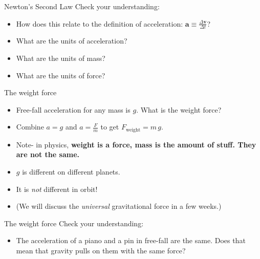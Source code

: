 \documentclass[english]{beamer}
\begin{document}
\begin{frame}{Newton's Second Law}
  Check your understanding: 
  \begin{itemize}
    \item How does this relate to the definition of acceleration: $\mathbf{a} \equiv \frac{\Delta \mathbf{v}}{\Delta t}$?
    \item What are the units of acceleration?
    \item What are the units of mass? 
    \item What are the units of force?
  \end{itemize}
\end{frame}

\begin{frame}{The weight force}
  \begin{itemize}
    \item Free-fall acceleration for any mass is $g$. What is the weight force?
    \item Combine $a=g$ and $a=\frac{F}{m}$ to get $F_{\text{weight}}=m\,g$.
    \item Note- in physics, \textbf{weight is a force, mass is the amount of stuff. They are not the same.}
    \item $g$ is different on different planets.
    \item It is \emph{not} different in orbit!
    \item (We will discuss the \emph{universal} gravitational force in a few weeks.)
  \end{itemize}
\end{frame}

\begin{frame}{The weight force}
  Check your understanding:
  \begin{itemize}
    \item The acceleration of a piano and a pin in free-fall are the same. Does that mean that gravity pulls on them with the same force?
  \end{itemize}
\end{frame}
\end{document}
